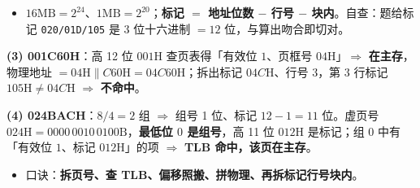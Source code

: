 \documentclass[11pt,a4paper]{ctexart}
\begin{document}
\begin{itemize}

\item $16\mathrm{MB}=2^{24}$、$1\mathrm{MB}=2^{20}$；\textbf{标记 $=$ 地址位数 $-$ 行号 $-$ 块内}。自查：题给标记 \texttt{020/01D/105} 是 3 位十六进制 $=12$ 位，与算出吻合即切对。

\end{itemize}


\textbf{(3) 001C60H}：高 12 位 $001\mathrm{H}$ 查页表得「有效位 $1$、页框号 $04\mathrm{H}$」$\Rightarrow$ \textbf{在主存}，物理地址 $=04\mathrm{H}\|C60\mathrm{H}=04C60\mathrm{H}$；拆出标记 $04C\mathrm{H}$、行号 $3$，第 3 行标记 $105\mathrm{H}\ne04C\mathrm{H}$ $\Rightarrow$ \textbf{不命中}。

\textbf{(4) 024BACH}：$8/4=2$ 组 $\Rightarrow$ 组号 1 位、标记 $12-1=11$ 位。虚页号 $024\mathrm{H}=0000\,0010\,0100\mathrm{B}$，\textbf{最低位 $0$ 是组号}，高 11 位 $012\mathrm{H}$ 是标记；组 0 中有「有效位 $1$、标记 $012\mathrm{H}$」的项 $\Rightarrow$ \textbf{TLB 命中，该页在主存}。







\begin{itemize}

\item 口诀：\textbf{拆页号、查 TLB、偏移照搬、拼物理、再拆标记行号块内}。

\end{itemize}
\end{document}
